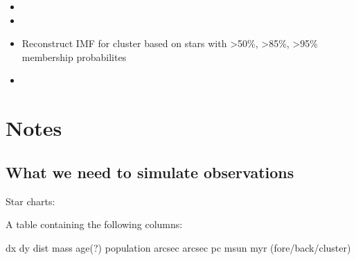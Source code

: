 \documentclass[letterpaper,10pt,english]{sphinxmanual}
\begin{document}
\begin{enumerate}
\begin{description}
\begin{itemize}
\item {} 
\sphinxAtStartPar
{}

\item {} 
\sphinxAtStartPar
{}

\item {} 
\sphinxAtStartPar
Reconstruct IMF for cluster based on stars with \textgreater{}50\%, \textgreater{}85\%, \textgreater{}95\% membership probabilites

\item {} 
\sphinxAtStartPar
{}

\end{itemize}

\end{description}

\end{enumerate}


\section{Notes}
\label{\detokenize{Project_Overview/Tasks:notes}}

\subsection{What we need to simulate observations}
\label{\detokenize{Project_Overview/Tasks:what-we-need-to-simulate-observations}}
\sphinxAtStartPar
Star charts:

\sphinxAtStartPar
A table containing the following columns:

\begin{sphinxVerbatim}[commandchars=\\\{\}]
dx      dy      dist    mass    age(?)  population
arcsec  arcsec  pc      msun    myr     (fore/back/cluster)
\end{sphinxVerbatim}
\end{document}

